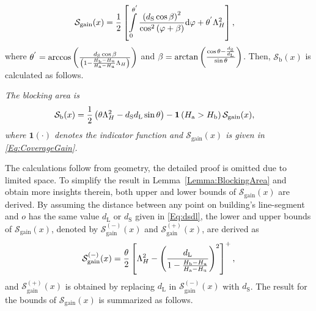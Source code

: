 \documentclass[12pt, draftclsnofoot, onecolumn]{IEEEtran}
\begin{document}
\begin{align}\label{Eq:CoverageGain}
\mathcal{S}_{\textrm{gain}}(x) &= \frac{1}{2}\left[ \int\limits_{0}^{\theta^{'}}\frac{\left(d_{\textrm{S}}\cos\beta \right)^2}{\cos^2\left( \varphi + \beta \right)}\mathrm{d}\varphi  + \theta^{'}\Lambda_H^2 \right],
\end{align}
where $\theta^{'} = \arccos\left( \frac{d_{\textrm{S}}\cos{\beta}}{\left(1 - \frac{H_{\mathrm{b}} - H_{\mathrm{u}}}{H_{\mathrm{a}} - H_{\mathrm{u}}}\Lambda_H\right)} \right)$ and $\beta = \arctan\left( \frac{\cos{\theta} - \frac{d_{\textrm{S}}}{d_{\textrm{L}}}}{\sin{\theta}} \right)$.  Then,  $\mathcal{S}_{\textrm{b}}(x)$ is calculated as follows.
\begin{lemma}\label{Lemma:BlockingArea}\emph{The blocking area is
\begin{align}\label{Eq:BlockingArea}
\mathcal{S}_{\textrm{b}}(x) &= \frac{1}{2}\left(\theta \Lambda_H^2  - d_{\textrm{S}}d_{\textrm{L}}\sin\theta\right) - \mathbf{1}\left( H_{\textrm{a}} > H_{\textrm{b}} \right)\mathcal{S}_{\textrm{gain}}(x),
\end{align}
where $\mathbf{1}(\cdot)$ denotes the indicator function and $\mathcal{S}_{\textrm{gain}}(x)$ is given in \eqref{Eq:CoverageGain}.}
\end{lemma}
The calculations follow from geometry, the detailed proof is omitted due to limited space. To simplify the result in Lemma~\ref{Lemma:BlockingArea} and obtain more insights therein, both upper and lower bounds of $\mathcal{S}_{\textrm{gain}}(x)$ are derived. By assuming the distance between any point on building's line-segment and $o$ has the same value $d_{\textrm{L}}$ or $d_{\textrm{S}}$ given in \eqref{Eq:dsdl}, the lower and upper bounds of $\mathcal{S}_{\textrm{gain}}(x)$, denoted by $\mathcal{S}_{\textrm{gain}}^{(-)}(x)$ and $\mathcal{S}_{\textrm{gain}}^{(+)}(x)$, are derived as
\begin{align}\label{Eq:LowerBoundS_gain}
\mathcal{S}_{\textrm{gain}}^{(-)}(x) = \frac{\theta}{2}\left[\Lambda_H^2 - \left( \frac{d_{\textrm{L}}}{1 -  \frac{H_{\mathrm{b}} - H_{\mathrm{u}}}{H_{\mathrm{a}} - H_{\mathrm{u}}}} \right)^2\right]^{+},
\end{align}
and $\mathcal{S}_{\textrm{gain}}^{(+)}(x)$ is obtained by replacing $d_{\textrm{L}}$ in $\mathcal{S}_{\textrm{gain}}^{(-)}(x)$ with $d_{\textrm{S}}$. The result for the bounds of $\mathcal{S}_{\textrm{gain}}(x)$ is summarized as follows.
\end{document}
